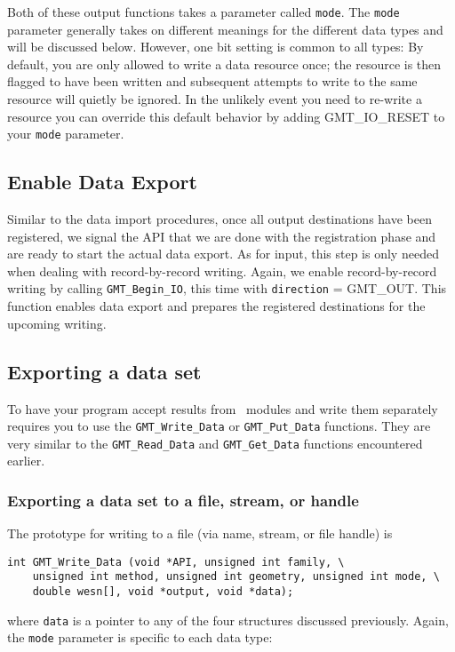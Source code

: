 \documentclass[11pt]{report}
\begin{document}
Both of these output functions takes a parameter called \texttt{mode}.  The \texttt{mode} parameter generally
takes on different meanings for the different data types and will be discussed below.
However, one bit setting is common to all types: By default, you are only allowed to write a
data resource once; the resource is then flagged to have been written and subsequent attempts to write
to the same resource will quietly be ignored.  In the unlikely event you need to re-write a
resource you can override this default behavior by adding GMT\_IO\_RESET to your \texttt{mode} parameter.

\subsection{Enable Data Export}

Similar to the data import procedures, once all output destinations have been registered, we signal the API that we are done with the registration
phase and are ready to start the actual data export.  As for input, this step is only needed when dealing with record-by-record writing.
Again, we enable record-by-record writing by calling \texttt{GMT\_Begin\_IO}, this time with \texttt{direction} = GMT\_OUT.
This function enables data export and prepares the registered destinations for the upcoming writing.  


\subsection{Exporting a data set}

To have your program accept results from \GMT\ modules and write them
separately requires you to use the \texttt{GMT\_Write\_Data} or \texttt{GMT\_Put\_Data} functions.  They are
very similar to the \texttt{GMT\_Read\_Data} and \texttt{GMT\_Get\_Data} functions encountered earlier.

\subsubsection{Exporting a data set to a file, stream, or handle}
The prototype for writing to a file (via name, stream, or file handle) is

\begin{verbatim}
int GMT_Write_Data (void *API, unsigned int family, \
    unsigned int method, unsigned int geometry, unsigned int mode, \
    double wesn[], void *output, void *data);
\end{verbatim}
where \texttt{data} is a pointer to any of the four structures
discussed previously.  Again, the \texttt{mode} parameter is specific to
each data type:
\end{document}
